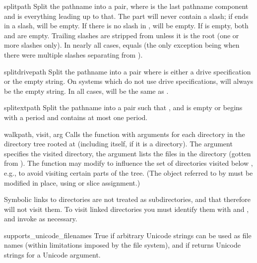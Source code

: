 \begin{funcdesc}{split}{path}
Split the pathname  into a pair,  where  is the last pathname component and
 is everything leading up to that.  The  part will
never contain a slash; if  ends in a slash,  will
be empty.  If there is no slash in ,  will be
empty.  If  is empty, both  and  are
empty.  Trailing slashes are stripped from  unless it is the
root (one or more slashes only).  In nearly all cases,
 equals  (the only
exception being when there were multiple slashes separating 
from ).
\end{funcdesc}

\begin{funcdesc}{splitdrive}{path}
Split the pathname  into a pair  where  is either a drive specification or the
empty string.  On systems which do not use drive specifications,
 will always be the empty string.  In all cases,
 will be the same as .
\end{funcdesc}

\begin{funcdesc}{splitext}{path}
Split the pathname  into a pair  
such that ,
and  is empty or begins with a period and contains
at most one period.
\end{funcdesc}

\begin{funcdesc}{walk}{path, visit, arg}
Calls the function  with arguments
 for each directory in the
directory tree rooted at  (including  itself, if it
is a directory).  The argument  specifies the visited
directory, the argument  lists the files in the directory
(gotten from ).
The  function may modify  to
influence the set of directories visited below , e.g., to
avoid visiting certain parts of the tree.  (The object referred to by
 must be modified in place, using  or slice
assignment.)

\begin{notice}
Symbolic links to directories are not treated as subdirectories, and
that  therefore will not visit them. To visit linked
directories you must identify them with
 and
, and invoke  as
necessary.
\end{notice}

\end{funcdesc}

\begin{datadesc}{supports_unicode_filenames}
True if arbitrary Unicode strings can be used as file names (within
limitations imposed by the file system), and if
 returns Unicode strings for a Unicode
argument.
\end{datadesc}
